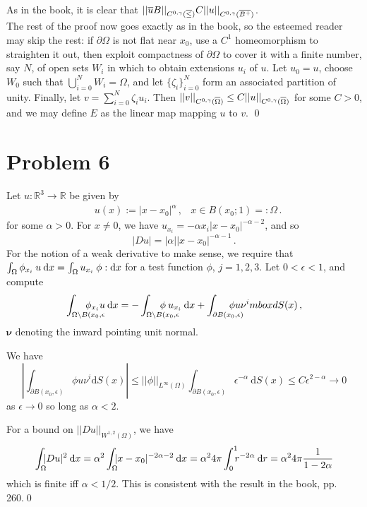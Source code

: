 \documentclass[11pt]{amsart}
\theoremstyle{definition}
\newcommand{\R}{\mathbb{R}}
\numberwithin{equation}{section}
\begin{document}
As in the book, it is clear that $||\overline{u}{B}||_{C^{0,\gamma}(\overline{\leq})} C||u||_{C^{0,\gamma}(\overline{B^+})}$.
\\

The rest of the proof now goes exactly as in the book, so the esteemed reader may skip the rest: if $\partial \Omega$ is not flat near $x_0$, use a $C^1$ homeomorphism to straighten it out, then exploit compactness of $\partial \Omega$ to cover it with a finite number, say $N$, of open sets $W_i$ in which to obtain extensions $u_i$ of $u$. Let $u_0 = u$, choose $W_0$ such that $\bigcup_{i=0}^N W_i = \Omega$, and let $\{\zeta_i\}_{i=0}^N$ form an associated partition of unity. Finally, let $v = \sum_{i=0}^N \zeta_i u_i$. Then $||v||_{C^{0,\gamma}(\overline{\Omega})} \leq C||u||_{C^{0,\gamma}(\overline{\Omega})}$ for some $C > 0$, and we may define $E$ as the linear map mapping $u$ to $v$.
\qed

\section{Problem 6}
Let $u: \R^3 \to \R$ be given by
\begin{align}
&u(x) := |x - x_0|^{\alpha}\,,
&
x\in B(x_0;1) =: \Omega\,.
\end{align}
for some $\alpha > 0$. For $x \neq 0$, we have $u_{x_i} = -\alpha x_i |x - x_0|^{-\alpha-2}$, and so
\begin{equation}
|D u| = |\alpha| |x-x_0|^{-\alpha - 1}\,.
\end{equation}
For the notion of a weak derivative to make sense, we require that $\int_\Omega \phi_{x_i}\: u\:\mbox{d}x = \int_\Omega u_{x_i} \:\phi :\mbox{d}x$ for a test function $\phi$, $j = 1, 2, 3$. Let $0 < \epsilon < 1$, and compute
\begin{equation}
\int_{\Omega \setminus B(x_0,\epsilon}\!\!\!\!\!\!\!\!\!\!\!\!\!
\phi_{x_i} u
\:\dx
=
-
\int_{\Omega \setminus B(x_0,\epsilon}\!\!\!\!\!\!\!\!\!\!\!\!\!
\phi\: u_{x_i}
\:\dx
+ 
\int_{\partial B(x_0, \epsilon)}\!\!\!\!\!\!\!\!\!\!
\phi u \nu^i
\\mbox{d}S(x)\,,
\end{equation}
$\mathbf{\nu}$ denoting the inward pointing unit normal.

We have
\begin{equation}
\left|
\int_{\partial B(x_0, \epsilon)}\!\!\!\!\!\!\!\!\!\!
\phi u \nu^i
\mbox{d}S(x)
\right|
\leq
||\phi||_{L^\infty(\Omega)}
\int_{\partial B(x_0, \epsilon)}\!\!\!\!\!\!\!\!\!\!
\epsilon^{-\alpha}\:\mbox{d}S(x)
\leq
C \epsilon^{2-\alpha} \to 0
\end{equation}
as $\epsilon \to 0$ so long as $\alpha < 2$.

For a bound on $||Du||_{W^{1,2}(\Omega)}$, we have
\begin{equation}
\int_\Omega\!\!\! |Du|^2\:\dx
= 
\alpha^2
\int_\Omega\!\!\! |x-x_0|^{-2\alpha-2}\:\dx
= \alpha^2 4\pi
\int_0^1 \!\!\!  r^{-2\alpha}\:\mbox{d}r 
= 
\alpha^2 4\pi \frac{1}{1 - 2\alpha}
\end{equation}
which is finite iff $\alpha < 1/2$. This is consistent with the result in the book, pp. 260.\qed
\end{document}
